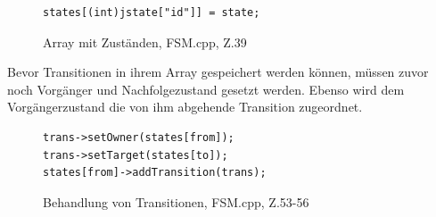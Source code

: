 \begin{figure}[thp]
\begin{lstlisting}[style=json]
states[(int)jstate["id"]] = state;

\end{lstlisting}
\centering
\caption{Array mit Zuständen, FSM.cpp, Z.39}
\end{figure}



Bevor Transitionen in ihrem Array gespeichert werden können, müssen zuvor noch
Vorgänger und Nachfolgezustand gesetzt werden. Ebenso wird dem Vorgängerzustand
die von ihm abgehende Transition zugeordnet.

\begin{figure}[thp]
\begin{lstlisting}[style=json]
trans->setOwner(states[from]);
trans->setTarget(states[to]);
states[from]->addTransition(trans);

\end{lstlisting}
\centering
\caption{Behandlung von Transitionen, FSM.cpp, Z.53-56}
\end{figure}

